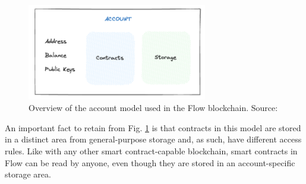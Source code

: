 \documentclass[./4_GeneralApproach.tex]{subfiles}
\begin{document}
\begin{figure}[htp]
    \centering
    \includegraphics[width=0.7\textwidth]{../Images/Flow_account_model.png}
    \caption{Overview of the account model used in the Flow blockchain. Source: \cite{flow2024}}
    \label{fig:flow_account_model}
\end{figure}

An important fact to retain from Fig. \ref{fig:flow_account_model} is that contracts in this model are stored in a distinct area from general-purpose storage and, as such, have different access rules. Like with any other smart contract-capable blockchain, smart contracts in Flow can be read by anyone, even though they are stored in an account-specific storage area.
\end{document}
